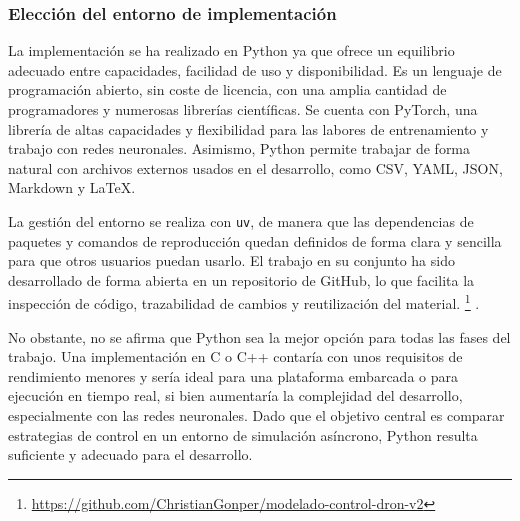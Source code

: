 \subsubsection*{Elección del entorno de implementación}

La implementación se ha realizado en Python ya que ofrece un equilibrio adecuado
entre capacidades, facilidad de uso y disponibilidad. Es un lenguaje de programación
abierto, sin coste de licencia, con una amplia cantidad de programadores y numerosas
librerías científicas. Se cuenta con PyTorch, una librería de altas capacidades y
flexibilidad para las labores de entrenamiento y trabajo con redes neuronales.
Asimismo, Python permite trabajar de forma natural con archivos externos usados
en el desarrollo, como CSV, YAML, JSON, Markdown y LaTeX.

La gestión del entorno se realiza con \texttt{uv}, de manera que las dependencias de
paquetes y comandos de reproducción quedan definidos de forma clara y sencilla para
que otros usuarios puedan usarlo. El trabajo en su conjunto ha sido desarrollado de
forma abierta en un repositorio de GitHub, lo que facilita la inspección de código,
trazabilidad de cambios y reutilización del material. \footnote{\url{https://github.com/ChristianGonper/modelado-control-dron-v2}}
\cite{pytorchDocs,uvDocs,githubDocs}.

No obstante, no se afirma que Python sea la mejor opción para todas las fases del trabajo.
Una implementación en C o C++ contaría con unos requisitos de rendimiento menores y sería
ideal para una plataforma embarcada o para ejecución en tiempo real, si bien aumentaría la
complejidad del desarrollo, especialmente con las redes neuronales. Dado que el objetivo
central es comparar estrategias de control en un entorno de simulación asíncrono, Python
resulta suficiente y adecuado para el desarrollo.